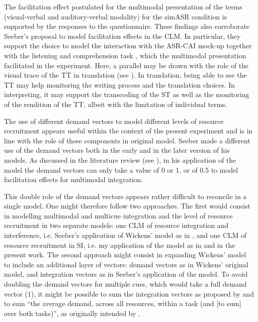 The facilitation effect postulated for the multimodal presentation of the terms (visual-verbal and auditory-verbal modality) for the simASR condition is supported by the responses to the questionnaire. These findings also corroborate Seeber's proposal to model facilitation effects in the CLM. In particular, they support the choice to model the interaction with the ASR-CAI mock-up together with the listening and comprehension task \citep[472]{seeber_multimodal_2017}, which the multimodal presentation facilitated in the experiment. Here, a parallel may be drawn with the role of the visual trace of the TT in translation (see \citealt{schaeffer2019monitoring}). In translation, being able to see the TT may help monitoring the writing process and the translation choices. In interpreting, it may support the transcoding of the ST as well as the monitoring of the rendition of the TT, albeit with the limitation of individual terms.

The use of different demand vectors to model different levels of resource recruitment appears useful within the context of the present experiment and is in line with the role of these components in  original model. Seeber made a different use of the demand vectors both in the early and in the later version of his models. As discussed in the literature review (see ), in his application of the model the demand vectors can only take a value of 0 or 1, or of 0.5 to model facilitation effects for multimodal integration.

This double role of the demand vectors appears rather difficult to reconcile in a single model. One might therefore follow two approaches. The first would consist in modelling multimodal and multicue integration and the level of resource recruitment in two separate models: one CLM of resource integration and interference, i.e. Seeber's application of Wickens' model as in \citet{seeber_multimodal_2017}, and one CLM of resource recruitment in SI, i.e. my application of the model as in \citet{prandi_designing_2017, prandi_exploratory_2018} and in the present work. The second approach might consist in expanding Wickens' model to include an additional layer of vectors: demand vectors as in Wickens' original model, and integration vectors as in Seeber's application of the model. To avoid doubling the demand vectors for multiple cues, which would take a full demand vector (1), it might be possible to sum the integration vectors as proposed by \citet{seeber_multimodal_2017} and to sum ``the average demand, across all resources, within a task (and [to sum] over both tasks)'', as originally intended by \citet[171]{wickens_multiple_2002}.

